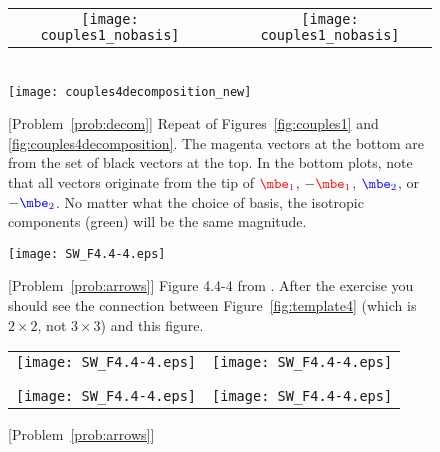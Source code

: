 \documentclass[11pt,titlepage,fleqn]{article}
\newcommand{\eone}{\textcolor{red}{\mbe_1}}
\newcommand{\etwo}{\textcolor{blue}{\mbe_2}}
\begin{document}
\begin{figure}
\centering
\begin{tabular}{ccc}
\texttt{[image: couples1\_nobasis]}
& \hspace{1.4cm} &
\texttt{[image: couples1\_nobasis]}
\end{tabular}
\\
\makebox{\hspace{0.5cm}}
\texttt{[image: couples4decomposition\_new]}
\caption{
[Problem~\ref{prob:decom}]
Repeat of Figures~\ref{fig:couples1} and \ref{fig:couples4decomposition}.
The magenta vectors at the bottom are from the set of black vectors at the top.
In the bottom plots, note that all vectors originate from the tip of $\eone$, $-\eone$, $\etwo$, or $-\etwo$.
No matter what the choice of basis, the isotropic components (green) will be the same magnitude.
\label{fig:decom}
}
\end{figure}


\begin{figure}
\centering
\texttt{[image: SW\_F4.4-4.eps]}
\caption{
[Problem~\ref{prob:arrows}]
Figure 4.4-4 from \citet{SteinWysession}.
After the exercise you should see the connection between Figure~\ref{fig:template4} (which is $2 \times 2$, not $3 \times 3$) and this figure.
\label{fig:SW}
}
\end{figure}

\begin{figure}
\hspace{-1cm}
\begin{tabular}{c|c}
\texttt{[image: SW\_F4.4-4.eps]} & \texttt{[image: SW\_F4.4-4.eps]} \\
& \\ \hline
& \\
\texttt{[image: SW\_F4.4-4.eps]} & \texttt{[image: SW\_F4.4-4.eps]} 
\end{tabular}
\caption{
[Problem~\ref{prob:arrows}]
\label{fig:SWfour}
}
\end{figure}

\clearpage\pagebreak


\end{document}
